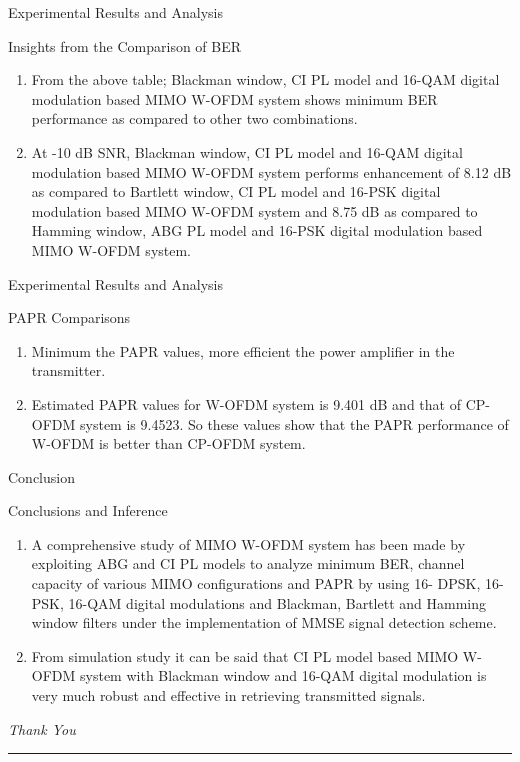 \documentclass{beamer}
\begin{document}
\begin{frame}{Experimental Results and Analysis}
    \begin{block}{Insights from the Comparison of BER}
       \begin{enumerate}
        \item From the above table; Blackman window, CI PL model and 16-QAM digital modulation based MIMO W-OFDM system shows minimum BER performance as compared to other two combinations.
        \item At -10 dB SNR, Blackman window, CI PL model and 16-QAM digital modulation based MIMO W-OFDM system performs enhancement of 8.12 dB as compared to Bartlett window, CI PL model and 16-PSK digital modulation based MIMO W-OFDM system and 8.75 dB as compared to Hamming window, ABG PL model and 16-PSK digital modulation based MIMO W-OFDM system.
    \end{enumerate}
    \end{block}
\end{frame}

\begin{frame}{Experimental Results and Analysis}
    \begin{block}{PAPR Comparisons}
       \begin{enumerate}
           \item Minimum the PAPR values, more efficient the power amplifier in the transmitter.
           \item Estimated PAPR values for W-OFDM system is 9.401 dB and that of CP-OFDM system is 9.4523. So these values show that the PAPR performance of W-OFDM is better than CP-OFDM system.
       \end{enumerate}
    \end{block}
\end{frame}


\begin{frame}{Conclusion}
    \begin{block}{Conclusions and Inference}
       \begin{enumerate}
           \item A comprehensive study of MIMO W-OFDM system has been made by exploiting ABG and CI PL models to analyze minimum BER, channel capacity of various MIMO configurations and PAPR by using 16- DPSK, 16-PSK, 16-QAM digital modulations and Blackman, Bartlett and Hamming window filters under the implementation of MMSE signal detection scheme.
           \item From simulation study it can be said that CI PL model based MIMO W-OFDM system with Blackman window and 16-QAM digital modulation is very much robust and effective in retrieving transmitted signals.
       \end{enumerate}
    \end{block}
\end{frame}


\begin{frame}{}
    \centering
    
    \LARGE \textit{Thank You}\\
    \rule{3cm}{1mm}
\end{frame}
\end{document}
